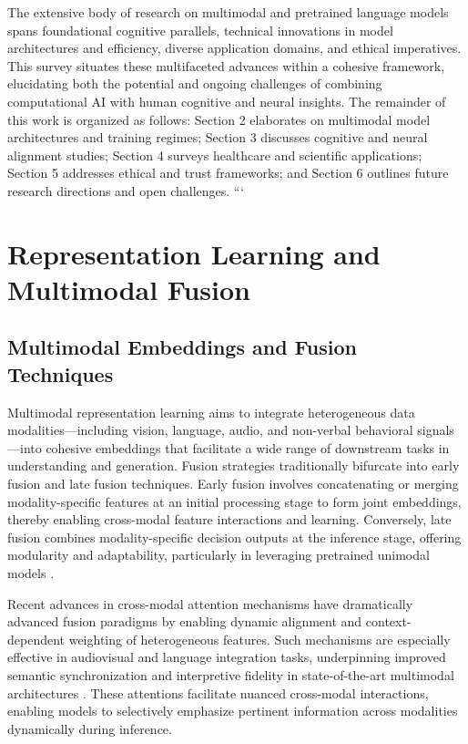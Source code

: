 \documentclass[11pt]{article}
\begin{document}
The extensive body of research on multimodal and pretrained language models spans foundational cognitive parallels, technical innovations in model architectures and efficiency, diverse application domains, and ethical imperatives. This survey situates these multifaceted advances within a cohesive framework, elucidating both the potential and ongoing challenges of combining computational AI with human cognitive and neural insights. The remainder of this work is organized as follows: Section 2 elaborates on multimodal model architectures and training regimes; Section 3 discusses cognitive and neural alignment studies; Section 4 surveys healthcare and scientific applications; Section 5 addresses ethical and trust frameworks; and Section 6 outlines future research directions and open challenges.
```

\section{Representation Learning and Multimodal Fusion}

\subsection{Multimodal Embeddings and Fusion Techniques}

Multimodal representation learning aims to integrate heterogeneous data modalities—including vision, language, audio, and non-verbal behavioral signals—into cohesive embeddings that facilitate a wide range of downstream tasks in understanding and generation. Fusion strategies traditionally bifurcate into early fusion and late fusion techniques. Early fusion involves concatenating or merging modality-specific features at an initial processing stage to form joint embeddings, thereby enabling cross-modal feature interactions and learning. Conversely, late fusion combines modality-specific decision outputs at the inference stage, offering modularity and adaptability, particularly in leveraging pretrained unimodal models \cite{ref1,ref2}. 

Recent advances in cross-modal attention mechanisms have dramatically advanced fusion paradigms by enabling dynamic alignment and context-dependent weighting of heterogeneous features. Such mechanisms are especially effective in audiovisual and language integration tasks, underpinning improved semantic synchronization and interpretive fidelity in state-of-the-art multimodal architectures \cite{ref3,ref4,ref5,ref12,ref32}. These attentions facilitate nuanced cross-modal interactions, enabling models to selectively emphasize pertinent information across modalities dynamically during inference.
\end{document}
